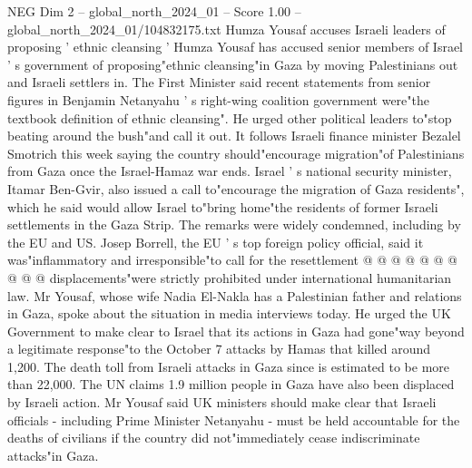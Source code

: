 \begin{textsample}{NEG Dim 2 – global\_north\_2024\_01 – Score 1.00 – global\_north\_2024\_01/104832175.txt}  \label{ex:f2_neg_340}
Humza Yousaf accuses Israeli leaders of proposing ' ethnic cleansing ' Humza Yousaf has accused senior members of Israel ' s government of proposing"ethnic cleansing"in Gaza by moving Palestinians out and Israeli settlers in.
The First Minister said recent statements from senior figures in Benjamin Netanyahu ' s right-wing coalition government were"the textbook definition of ethnic cleansing".
He urged other political leaders to"stop beating around the bush"and call it out.
It follows Israeli finance minister Bezalel Smotrich this week saying the country should"encourage migration"of Palestinians from Gaza once the Israel-Hamaz war ends.
Israel ' s national security minister, Itamar Ben-Gvir, also issued a call to"encourage the migration of Gaza residents", which he said would allow Israel to"bring home"the residents of former Israeli settlements in the Gaza Strip.
The remarks were widely condemned, including by the EU and US.
Josep Borrell, the EU ' s top foreign policy official, said it was"inflammatory and irresponsible"to call for the resettlement @ @ @ @ @ @ @ @ @ @ displacements"were strictly prohibited under international humanitarian law.
Mr Yousaf, whose wife Nadia El-Nakla has a Palestinian father and relations in Gaza, spoke about the situation in media interviews today.
He urged the UK Government to make clear to Israel that its actions in Gaza had gone"way beyond a legitimate response"to the October 7 attacks by Hamas that killed around 1,200.
The death toll from Israeli attacks in Gaza since is estimated to be more than 22,000.
The UN claims 1.9 million people in Gaza have also been displaced by Israeli action.
Mr Yousaf said UK ministers should make clear that Israeli officials - including Prime Minister Netanyahu - must be held accountable for the deaths of civilians if the country did not"immediately cease indiscriminate attacks"in Gaza.

\end{textsample}
